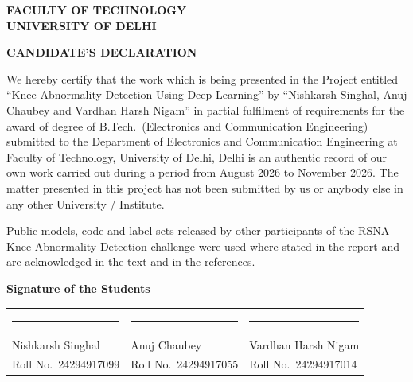 
\clearpage
{}
{}
\begin{center}
{\singlespacing\bfseries\fontsize{16}{20}\selectfont FACULTY OF TECHNOLOGY\\[4pt] UNIVERSITY OF DELHI\par}
\end{center}
\vspace{10pt}
\begin{center}
{\bfseries\fontsize{12}{15}\selectfont CANDIDATE'S DECLARATION}
\end{center}
\vspace{4pt}
We hereby certify that the work which is being presented in the Project entitled ``Knee Abnormality Detection Using Deep Learning'' by ``Nishkarsh Singhal, Anuj Chaubey and Vardhan Harsh Nigam'' in partial fulfilment of requirements for the award of degree of B.Tech.\ (Electronics and Communication Engineering) submitted to the Department of Electronics and Communication Engineering at Faculty of Technology, University of Delhi, Delhi is an authentic record of our own work carried out during a period from August 2026 to November 2026. The matter presented in this project has not been submitted by us or anybody else in any other University / Institute.

Public models, code and label sets released by other participants of the RSNA Knee Abnormality Detection challenge were used where stated in the report and are acknowledged in the text and in the references.

\vspace{1.2cm}
\noindent\textbf{Signature of the Students}

\vspace{0.6cm}
{\singlespacing
\noindent\begin{tabular}{@{}p{5.0cm}p{5.0cm}p{5.0cm}@{}}
\rule{4.4cm}{0.4pt} & \rule{4.4cm}{0.4pt} & \rule{4.4cm}{0.4pt} \\
Nishkarsh Singhal & Anuj Chaubey & Vardhan Harsh Nigam \\
Roll No.\ 24294917099 & Roll No.\ 24294917055 & Roll No.\ 24294917014 \\
\end{tabular}}

